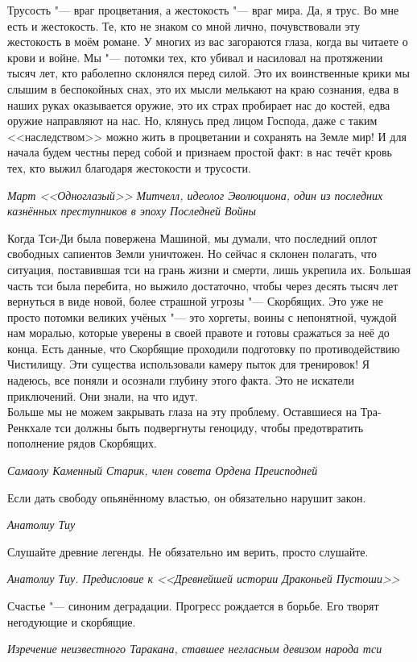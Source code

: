 \documentclass[a4paper,10pt]{book}
\begin{document}
\epigraph{Трусость "--- враг процветания, а жестокость "--- враг мира. Да, я 
трус. Во мне 
есть и жестокость. Те, кто не знаком со мной лично, почувствовали эту 
жестокость в моём романе. У многих из вас загораются глаза, когда вы читаете о 
крови и войне. Мы "--- потомки тех, кто убивал и насиловал на протяжении тысяч 
лет, кто раболепно склонялся перед силой. Это их воинственные крики мы слышим в 
беспокойных снах, это их мысли мелькают на краю сознания, едва в наших руках 
оказывается оружие, это их страх пробирает нас до костей, едва оружие 
направляют на нас. Но, клянусь пред лицом Господа, даже с таким <<наследством>> 
можно жить в процветании и сохранять на Земле мир! И для начала будем честны 
перед собой и признаем простой факт: в нас течёт кровь тех, кто выжил благодаря 
жестокости и трусости.}
{\textit{Март <<Одноглазый>> Митчелл, идеолог Эволюциона, один из последних 
казнённых преступников в эпоху Последней Войны}}

\epigraph{Когда Тси-Ди была повержена Машиной, мы думали, что последний оплот 
свободных 
сапиентов Земли уничтожен. Но сейчас я склонен полагать, что ситуация, 
поставившая тси на грань жизни и смерти, лишь укрепила их. Большая часть тси 
была перебита, но выжило достаточно, чтобы через десять тысяч лет вернуться в 
виде новой, более страшной угрозы "--- Скорбящих. Это уже не просто потомки 
великих учёных "--- это хоргеты, воины с непонятной, чуждой нам моралью, 
которые 
уверены в своей правоте и готовы сражаться за неё до конца. Есть данные,
что Скорбящие проходили подготовку по противодействию Чистилищу. Эти существа
использовали камеру пыток для тренировок! Я надеюсь, все поняли и осознали
глубину этого факта. Это не искатели приключений. Они знали, на что идут.\\
Больше мы не можем закрывать глаза на эту проблему. 
Оставшиеся на Тра-Ренкхале тси должны быть 
подвергнуты геноциду, чтобы предотвратить пополнение рядов Скорбящих.}
{\textit{Самаолу Каменный Старик, член совета Ордена Преисподней}}

\epigraph{Если дать свободу опьянённому властью, он обязательно нарушит закон.}
{\textit{Анатолиу Тиу}}

\epigraph{Слушайте древние легенды. Не обязательно им верить, просто слушайте.}
{\textit{Анатолиу Тиу. Предисловие к <<Древнейшей истории Драконьей Пустоши>>}}

\epigraph{Счастье "--- синоним деградации. Прогресс рождается в борьбе. Его 
творят 
негодующие и скорбящие.}
{\textit{Изречение неизвестного Таракана, ставшее негласным девизом народа тси}}
\end{document}
